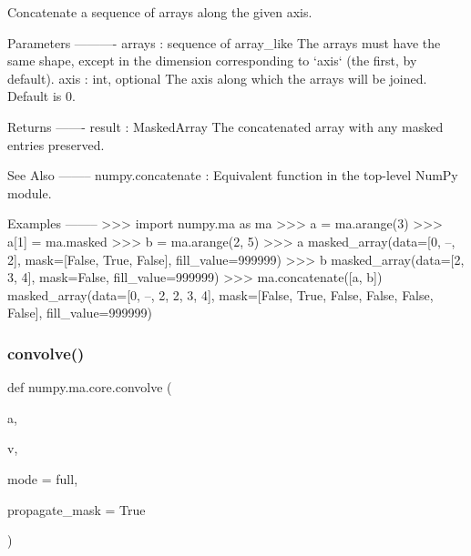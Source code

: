 \begin{DoxyVerb}Concatenate a sequence of arrays along the given axis.

Parameters
----------
arrays : sequence of array_like
    The arrays must have the same shape, except in the dimension
    corresponding to `axis` (the first, by default).
axis : int, optional
    The axis along which the arrays will be joined. Default is 0.

Returns
-------
result : MaskedArray
    The concatenated array with any masked entries preserved.

See Also
--------
numpy.concatenate : Equivalent function in the top-level NumPy module.

Examples
--------
>>> import numpy.ma as ma
>>> a = ma.arange(3)
>>> a[1] = ma.masked
>>> b = ma.arange(2, 5)
>>> a
masked_array(data=[0, --, 2],
             mask=[False,  True, False],
       fill_value=999999)
>>> b
masked_array(data=[2, 3, 4],
             mask=False,
       fill_value=999999)
>>> ma.concatenate([a, b])
masked_array(data=[0, --, 2, 2, 3, 4],
             mask=[False,  True, False, False, False, False],
       fill_value=999999)\end{DoxyVerb}
 \mbox{\label{namespacenumpy_1_1ma_1_1core_a32eb5d3545066b7db575a404886daa8f}} 
\subsubsection{\texorpdfstring{convolve()}{convolve()}}
{\footnotesize\ttfamily def numpy.\+ma.\+core.\+convolve (\begin{DoxyParamCaption}\item[{}]{a,  }\item[{}]{v,  }\item[{}]{mode = {\ttfamily \textquotesingle{}full\textquotesingle{}},  }\item[{}]{propagate\+\_\+mask = {\ttfamily True} }\end{DoxyParamCaption})}

